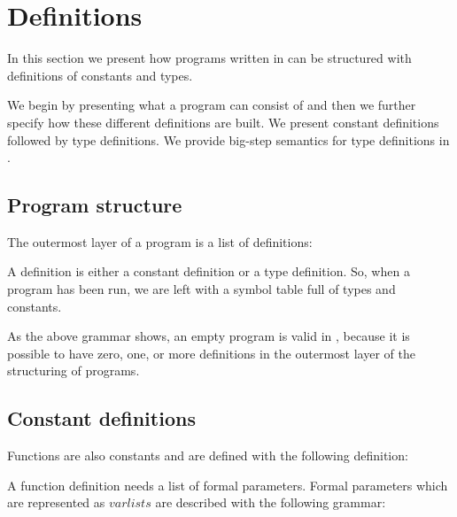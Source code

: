 \section{Definitions}
\label{sec:definitions}
In this section we present how programs written in \productname{} can be
structured with definitions of constants and types.

We begin by presenting what a program can consist of and then we further specify
how these different definitions are built. We present constant definitions
followed by type definitions. We provide big-step semantics for type definitions
in .

\subsection{Program structure}

The outermost layer of a \productname{} program is a list of definitions:

\begin{ebnf}
\end{ebnf}

A definition is either a constant definition or a type definition. So, when a
program has been run, we are left with a symbol table full of types and
constants.

As the above grammar shows, an empty program is valid in \productname{}, because
it is possible to have zero, one, or more definitions in the outermost layer of
the structuring of programs.

\subsection{Constant definitions}
\label{sec:constantdefinitions}

Functions are also constants and are defined with the following definition:

\begin{ebnf}
\end{ebnf}

A function definition needs a list of formal parameters. Formal parameters which
are represented as $varlists$ are described with the following grammar:

\begin{ebnf}
\end{ebnf}

